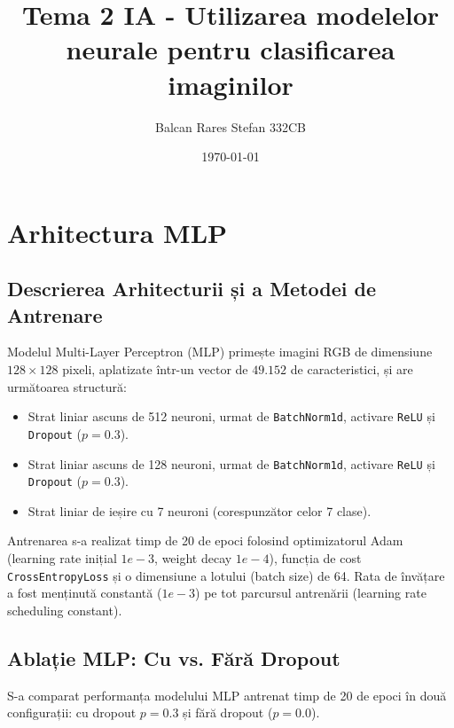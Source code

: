 \documentclass[12pt,a4paper]{article}
\title{Tema 2 IA - Utilizarea modelelor neurale pentru clasificarea imaginilor}
\author{Balcan Rares Stefan 332CB}
\date{\today}
\begin{document}
\maketitle

\section{Arhitectura MLP}

\subsection{Descrierea Arhitecturii și a Metodei de Antrenare}
Modelul Multi-Layer Perceptron (MLP) primește imagini RGB de dimensiune $128 \times 128$ pixeli, aplatizate într-un vector de $49.152$ de caracteristici, și are următoarea structură:
\begin{itemize}
    \item Strat liniar ascuns de 512 neuroni, urmat de \texttt{BatchNorm1d}, activare \texttt{ReLU} și \texttt{Dropout} ($p=0.3$).
    \item Strat liniar ascuns de 128 neuroni, urmat de \texttt{BatchNorm1d}, activare \texttt{ReLU} și \texttt{Dropout} ($p=0.3$).
    \item Strat liniar de ieșire cu 7 neuroni (corespunzător celor 7 clase).
\end{itemize}

Antrenarea s-a realizat timp de 20 de epoci folosind optimizatorul Adam (learning rate inițial $1e-3$, weight decay $1e-4$), funcția de cost \texttt{CrossEntropyLoss} și o dimensiune a lotului (batch size) de 64. Rata de învățare a fost menținută constantă ($1e-3$) pe tot parcursul antrenării (learning rate scheduling constant).

\subsection{Ablație MLP: Cu vs. Fără Dropout}
S-a comparat performanța modelului MLP antrenat timp de 20 de epoci în două configurații: cu dropout $p=0.3$ și fără dropout ($p=0.0$).

\begin{table}[h!]
\centering
\setlength{\tabcolsep}{4pt}
\caption{Ablație Dropout pe Arhitectura MLP}
\end{table}
\end{document}
